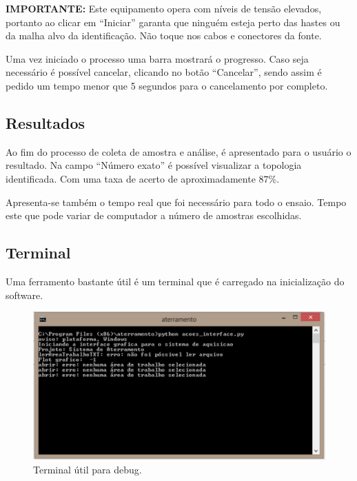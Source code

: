 \documentclass[a4paper, 10pt]{article}
\begin{document}
\textbf{IMPORTANTE:} Este equipamento opera com níveis de tensão elevados, portanto ao clicar em 
``Iniciar'' garanta que ninguém esteja perto das hastes ou da malha alvo da identificação. Não toque
nos cabos e conectores da fonte.

Uma vez iniciado o processo uma barra mostrará o progresso. Caso seja necessário é possível cancelar, 
clicando no botão ``Cancelar'', sendo assim é pedido um tempo menor que 5 segundos para o cancelamento
por completo.

\subsection{Resultados}


Ao fim do processo de coleta de amostra e análise, é apresentado para o usuário o resultado. 
Na campo ``Número exato'' é possível visualizar a topologia identificada. Com uma taxa de 
acerto de aproximadamente $87 \%$.

Apresenta-se também o tempo real que foi necessário para todo o ensaio. Tempo este que pode variar
de computador a número de amostras escolhidas.

\subsection{Terminal}

Uma ferramento bastante útil é um terminal que é carregado na inicialização do software.

\begin{figure}[!h]
    \caption{\label{fig_terminal}Terminal útil para debug.}
	    \begin{center}
            \includegraphics[scale=0.3]{../fotos/execucao/terminal.pdf}
	    \end{center}
\end{figure}
\end{document}
